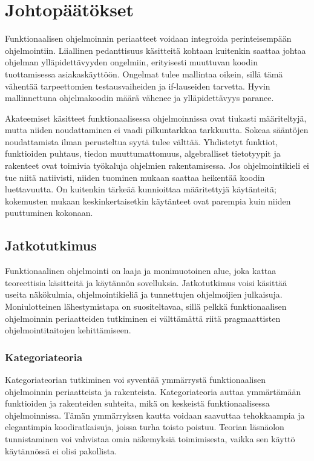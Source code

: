 \vspace{21.5pt}
\chapter{Johtopäätökset}

Funktionaalisen ohjelmoinnin periaatteet voidaan integroida perinteisempään ohjelmointiin. Liiallinen pedanttisuus käsitteitä kohtaan kuitenkin saattaa johtaa ohjelman ylläpidettävyyden ongelmiin, erityisesti muuttuvan koodin tuottamisessa asiakaskäyttöön. Ongelmat tulee mallintaa oikein, sillä tämä vähentää tarpeettomien testausvaiheiden ja if-lauseiden tarvetta. Hyvin mallinnettuna ohjelmakoodin määrä vähenee ja ylläpidettävyys paranee.

Akateemiset käsitteet funktionaalisessa ohjelmoinnissa ovat tiukasti määriteltyjä, mutta niiden noudattaminen ei vaadi pilkuntarkkaa tarkkuutta. Sokeaa sääntöjen noudattamista ilman perusteltua syytä tulee välttää. Yhdistetyt funktiot, funktioiden puhtaus, tiedon muuttumattomuus, algebralliset tietotyypit ja rakenteet ovat toimivia työkaluja ohjelmien rakentamisessa. Jos ohjelmointikieli ei tue niitä natiivisti, niiden tuominen mukaan saattaa heikentää koodin luettavuutta. On kuitenkin tärkeää kunnioittaa määritettyjä käytänteitä; kokemusten mukaan keskinkertaisetkin käytänteet ovat parempia kuin niiden puuttuminen kokonaan.

\section{Jatkotutkimus}

Funktionaalinen ohjelmointi on laaja ja monimuotoinen alue, joka kattaa teoreettisia käsitteitä ja käytännön sovelluksia. Jatkotutkimus voisi käsittää useita näkökulmia, ohjelmointikieliä ja tunnettujen ohjelmoijien julkaisuja. Moniulotteinen lähestymistapa on suositeltavaa, sillä pelkkä funktionaalisen ohjelmoinnin periaatteiden tutkiminen ei välttämättä riitä pragmaattisten ohjelmointitaitojen kehittämiseen.

\subsection{Kategoriateoria}

Kategoriateorian tutkiminen voi syventää ymmärrystä funktionaalisen ohjelmoinnin periaatteista ja rakenteista. Kategoriateoria auttaa ymmärtämään funktioiden ja rakenteiden suhteita, mikä on keskeistä funktionaalisessa ohjelmoinnissa. Tämän ymmärryksen kautta voidaan saavuttaa tehokkaampia ja elegantimpia koodiratkaisuja, joissa turha toisto poistuu. Teorian läsnäolon tunnistaminen voi vahvistaa omia näkemyksiä toimimisesta, vaikka sen käyttö käytännössä ei olisi pakollista.

